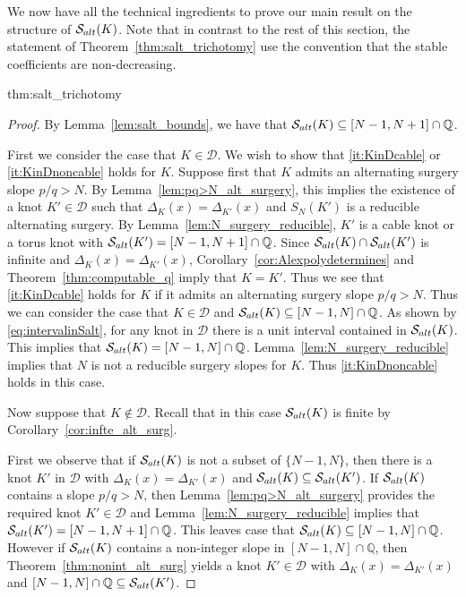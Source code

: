 \documentclass{amsart} %
\newcommand{\D}{\mathcal{D}}
\newcommand{\Q}{\mathbb{Q}}
\newcommand{\Salt}{\mathcal{S}_{\rm alt}}
\theoremstyle{thm}
\theoremstyle{definition}
\numberwithin{equation}{section}
\begin{document}
We now have all the technical ingredients to prove our main result on the structure of $\Salt(K)$. Note that in contrast to the rest of this section, the statement of Theorem~\ref{thm:salt_trichotomy} use the convention that the stable coefficients are non-decreasing.

\begin{repthm}{thm:salt_trichotomy}
  \salttrichotomy 
\end{repthm}
\begin{proof}
    By Lemma~\ref{lem:salt_bounds}, we have that $\Salt(K)\subseteq [N-1,N+1]\cap \Q$.
    
    First we consider the case that $K\in \D$. We wish to show that \eqref{it:KinDcable} or \eqref{it:KinDnoncable} holds for $K$. Suppose first that $K$ admits an alternating surgery slope $p/q>N$. By Lemma~\ref{lem:pq>N_alt_surgery}, this implies the existence of a knot $K'\in \D$ such that $\Delta_{K}(x)=\Delta_{K'}(x)$ and $S_N(K')$ is a reducible alternating surgery. By Lemma~\ref{lem:N_surgery_reducible}, $K'$ is a cable knot or a torus knot with $\Salt(K')= [N-1,N+1]\cap \Q$. Since $\Salt(K)\cap \Salt(K')$ is infinite and $\Delta_{K}(x)=\Delta_{K'}(x)$, Corollary~\ref{cor:Alexpolydetermines} and Theorem~\ref{thm:computable_q} imply that $K=K'$. Thus we see that \eqref{it:KinDcable} holds for $K$ if it admits an alternating surgery slope $p/q>N$.
    Thus we can consider the case that $K\in \D$ and $\Salt(K)\subseteq [N-1,N]\cap\Q$. As shown by \eqref{eq:intervalinSalt}, for any knot in $\D$ there is a unit interval contained in $\Salt(K)$. This implies that $\Salt(K)= [N-1,N]\cap\Q$. Lemma~\ref{lem:N_surgery_reducible} implies that $N$ is not a reducible surgery slopes for $K$. Thus \eqref{it:KinDnoncable} holds in this case.

    Now suppose that $K\not\in \D$. Recall that in this case $\Salt(K)$ is finite by Corollary~\ref{cor:infte_alt_surg}. 
    
    First we observe that if $\Salt(K)$ is not a subset of $\{N-1, N\}$, then there is a knot $K'$ in $\D$ with $\Delta_K(x)=\Delta_{K'}(x)$ and $\Salt(K)\subseteq \Salt(K')$. If $\Salt(K)$ contains a slope $p/q>N$, then Lemma~\ref{lem:pq>N_alt_surgery} provides the required knot $K'\in \D$ and Lemma~\ref{lem:N_surgery_reducible} implies that $\Salt(K')=[N-1,N+1]\cap \Q$. This leaves case that $\Salt(K)\subseteq [N-1, N]\cap \Q$. However if $\Salt(K)$ contains a non-integer slope in $[N-1, N]\cap \Q$, then Theorem~\ref{thm:nonint_alt_surg} yields a knot $K'\in\D$ with $\Delta_K(x)=\Delta_{K'}(x)$ and $[N-1, N]\cap \Q\subseteq \Salt(K')$.


\end{proof}
\end{document}
